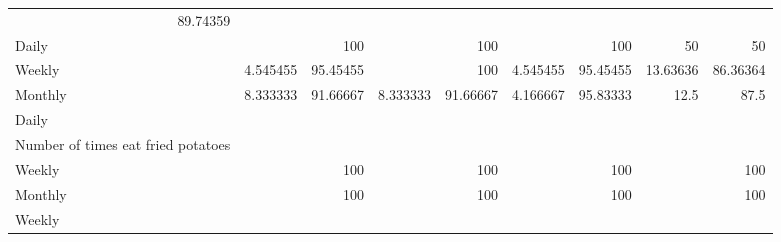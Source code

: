 \documentclass{article}
\begin{document}
\begin{tabular}{lllllllll}
  \multicolumn{1}{r}{89.74359} \\
\multicolumn{1}{l}{\hspace{7em}Daily} &
  \multicolumn{1}{|r}{} &
  \multicolumn{1}{r}{100} &
  \multicolumn{1}{r}{} &
  \multicolumn{1}{r}{100} &
  \multicolumn{1}{r}{} &
  \multicolumn{1}{r}{100} &
  \multicolumn{1}{r}{50} &
  \multicolumn{1}{r}{50} \\
\multicolumn{1}{l}{\hspace{7em}Weekly} &
  \multicolumn{1}{|r}{4.545455} &
  \multicolumn{1}{r}{95.45455} &
  \multicolumn{1}{r}{} &
  \multicolumn{1}{r}{100} &
  \multicolumn{1}{r}{4.545455} &
  \multicolumn{1}{r}{95.45455} &
  \multicolumn{1}{r}{13.63636} &
  \multicolumn{1}{r}{86.36364} \\
\multicolumn{1}{l}{\hspace{7em}Monthly} &
  \multicolumn{1}{|r}{8.333333} &
  \multicolumn{1}{r}{91.66667} &
  \multicolumn{1}{r}{8.333333} &
  \multicolumn{1}{r}{91.66667} &
  \multicolumn{1}{r}{4.166667} &
  \multicolumn{1}{r}{95.83333} &
  \multicolumn{1}{r}{12.5} &
  \multicolumn{1}{r}{87.5} \\
\multicolumn{1}{l}{\hspace{5em}Daily} &
  \multicolumn{1}{|r}{} &
  \multicolumn{1}{r}{} &
  \multicolumn{1}{r}{} &
  \multicolumn{1}{r}{} &
  \multicolumn{1}{r}{} &
  \multicolumn{1}{r}{} &
  \multicolumn{1}{r}{} &
  \multicolumn{1}{r}{} \\
\multicolumn{1}{l}{\hspace{6em}Number of times eat fried potatoes} &
  \multicolumn{1}{|r}{} &
  \multicolumn{1}{r}{} &
  \multicolumn{1}{r}{} &
  \multicolumn{1}{r}{} &
  \multicolumn{1}{r}{} &
  \multicolumn{1}{r}{} &
  \multicolumn{1}{r}{} &
  \multicolumn{1}{r}{} \\
\multicolumn{1}{l}{\hspace{7em}Weekly} &
  \multicolumn{1}{|r}{} &
  \multicolumn{1}{r}{100} &
  \multicolumn{1}{r}{} &
  \multicolumn{1}{r}{100} &
  \multicolumn{1}{r}{} &
  \multicolumn{1}{r}{100} &
  \multicolumn{1}{r}{} &
  \multicolumn{1}{r}{100} \\
\multicolumn{1}{l}{\hspace{7em}Monthly} &
  \multicolumn{1}{|r}{} &
  \multicolumn{1}{r}{100} &
  \multicolumn{1}{r}{} &
  \multicolumn{1}{r}{100} &
  \multicolumn{1}{r}{} &
  \multicolumn{1}{r}{100} &
  \multicolumn{1}{r}{} &
  \multicolumn{1}{r}{100} \\
\multicolumn{1}{l}{\hspace{5em}Weekly} &
  \multicolumn{1}{|r}{} &

\end{tabular}
\end{document}
